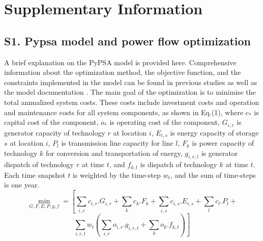 

\clearpage
{}
\section*{Supplementary Information}


\subsection*{S1. Pypsa model and power flow optimization}

A brief explanation on the PyPSA model is provided here.
 Comprehensive information about the optimization method, the objective function, and the constraints implemented in the model can be found in previous studies  as well as the model documentation . The main goal of the optimization is to minimise the total annualized system costs. These costs include investment costs and operation and maintenance costs for all system components, as shown in Eq.(1), where \(c_{*}\) is capital cost of the component, \(o_{*}\) is operating cost of the component, \(G_{i,r}\) is generator capacity of technology \(r\) at location \(i\), \(E_{i,s}\) is energy capacity of storage \(s\) at location \(i\), \(P_{l}\) is transmission line capacity for line \(l\), \(F_{k}\) is power capacity of technology \(k\) for conversion and transportation of energy, \(g_{i,r,t}\) is generator dispatch of technology \(r\)  at time \(t\), and \(f_{k,t}\) is dispatch of technology \(k\) at time \(t\). Each time snapshot \(t\) is weighted by the time-step \(w_{t}\), and the sum of time-steps is one year.
\begin{equation*}
\min_{G,F,E,P,g,f} = \left[ \sum_{i,r}^{}c_{i,r}.G_{i,r} + \sum_{k}^{}c_{k}.F_{k}+ \sum_{i,s}^{}c_{i,s}.E_{i,s}+ 
\sum_{l}^{}c_{l}.P_{l}+ 
 \right.
\end{equation*}
\begin{equation}
\left.\sum_{i,r,t}^{}w_{t}\left(\sum_{i,r}^{}o_{i,r}.g_{i,r,t}+\sum_{k}^{}o_{k}.f_{k,t}  \right)   \right]
\end{equation}

